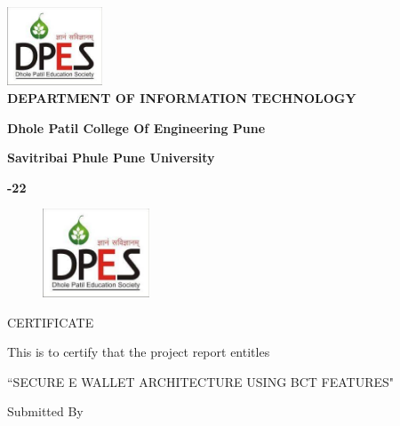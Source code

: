 \documentclass[oneside,a4paper,12pt]{report}
\begin{document}
\begin{center}
\includegraphics[width=80pt]{logo} \\
\vspace*{1\baselineskip}
{\bfseries \fontsize{14}{12} \selectfont DEPARTMENT OF INFORMATION TECHNOLOGY  \\}
\vspace*{0.5\baselineskip}

{\bfseries \fontsize{12}{12} \selectfont  Dhole Patil College Of Engineering Pune\\}
\vspace*{0.5\baselineskip}


{\bfseries \fontsize{12}{12} \selectfont Savitribai Phule Pune University \\}
\vspace*{0.5\baselineskip}

{\bfseries \fontsize{12}{12} -22\\}

\end{center}

\newpage
\begin{figure}[ht]
\centering
\includegraphics[width=90pt]{logo}
\end{figure}
{\bfseries \fontsize{14}{12} \selectfont \centerline{CERTIFICATE }
\vspace*{0.5\baselineskip}}

\centerline{This is to certify that the project report entitles }
\vspace*{0.5\baselineskip}

{\bfseries \fontsize{14}{12} \selectfont \centerline{``SECURE E WALLET ARCHITECTURE USING BCT FEATURES"}}
\vspace*{1\baselineskip}

{\bfseries \fontsize{14}{12} \selectfont \centerline{Submitted By }}
\vspace*{0.5\baselineskip}
\end{document}
